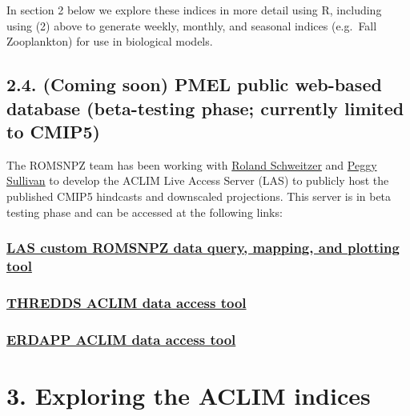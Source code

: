 \documentclass[
]{article}
\begin{document}
In section 2 below we explore these indices in more detail using R,
including using (2) above to generate weekly, monthly, and seasonal
indices (e.g.~Fall Zooplankton) for use in biological models.

\hypertarget{coming-soon-pmel-public-web-based-database-beta-testing-phase-currently-limited-to-cmip5}{%
\subsection{2.4. (Coming soon) PMEL public web-based database
(beta-testing phase; currently limited to
CMIP5)}\label{coming-soon-pmel-public-web-based-database-beta-testing-phase-currently-limited-to-cmip5}}

The ROMSNPZ team has been working with
\href{roland.schweitzer@noaa.gov}{Roland Schweitzer} and
\href{peggy.sullivan@noaa.gov}{Peggy Sullivan} to develop the ACLIM Live
Access Server (LAS) to publicly host the published CMIP5 hindcasts and
downscaled projections. This server is in beta testing phase and can be
accessed at the following links:

\hypertarget{las-custom-romsnpz-data-query-mapping-and-plotting-tool}{%
\subsubsection{\texorpdfstring{\href{https://data.pmel.noaa.gov/aclim/las/}{LAS
custom ROMSNPZ data query, mapping, and plotting
tool}}{LAS custom ROMSNPZ data query, mapping, and plotting tool}}\label{las-custom-romsnpz-data-query-mapping-and-plotting-tool}}

\hypertarget{thredds-aclim-data-access-tool}{%
\subsubsection{\texorpdfstring{\href{https://data.pmel.noaa.gov/aclim/thredds/}{THREDDS
ACLIM data access
tool}}{THREDDS ACLIM data access tool}}\label{thredds-aclim-data-access-tool}}

\hypertarget{erdapp-aclim-data-access-tool}{%
\subsubsection{\texorpdfstring{\href{https://data.pmel.noaa.gov/aclim/erddap/}{ERDAPP
ACLIM data access
tool}}{ERDAPP ACLIM data access tool}}\label{erdapp-aclim-data-access-tool}}

\hypertarget{exploring-the-aclim-indices}{%
\section{3. Exploring the ACLIM
indices}\label{exploring-the-aclim-indices}}
\end{document}
